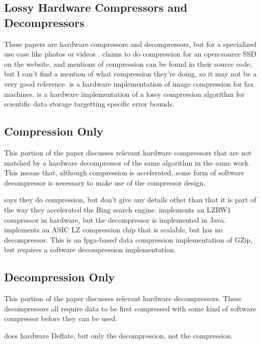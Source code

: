 \documentclass[doublespace,draft,nopageskip]{VTthesis} %
\begin{document}
\subsection{Lossy Hardware Compressors and Decompressors}\label{ss:lossy_hardware_compressors_and_decompressors}
These papers are hardware compressors and decompressors, but for a specialized use case like photos or videos \cite{videocompressionsystemsproject, jpeg}. \cite{openssd} claims to do compression for an open-source SSD on the website, and mentions of compression can be found in their source code, but I can't find a mention of what compression they're doing, so it may not be a very good reference. \cite{tiff} is a hardware implementation of image compression for fax machines. \cite{wavesz} is a hardware implementation of a lossy compression algorithm for scientific data storage targetting specific error bounds.

\subsection{Compression Only}\label{ss:compression_only}
This portion of the paper discusses relevant hardware compressors that are not matched by a hardware decompressor of the same algorithm in the same work. This means that, although compression is accelerated, some form of software decompressor is necessary to make use of the compressor design.

\cite{acceleratingdatacenter} says they do compression, but don't give any details other than that it is part of the way they accelerated the Bing search engine. \cite{lzrw1} implements an LZRW1 compressor in hardware, but the decompressor is implemented in Java. \cite{lzvlsi} implements an ASIC LZ compression chip that is scalable, but has no decompressor. \cite{fpgagzip} This is an fpga-based data compression implementation of GZip, but requires a software decompression implementation.

\subsection{Decompression Only}\label{ss:decompression_only}
This portion of the paper discusses relevant hardware decompressors. These decompressors all require data to be first compressed with some kind of software compressor before they can be used.

\cite{deflatedecompression} does hardware Deflate, but only the decompression, not the compression.
\end{document}
